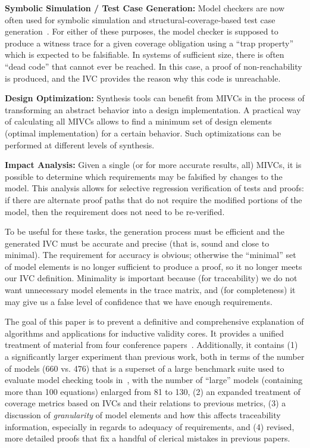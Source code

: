 \noindent \textbf{Symbolic Simulation / Test Case Generation:} Model checkers are now often used for symbolic simulation and structural-coverage-based test case generation~\cite{SimulinkDesignVerifier,Whalen13:OMCDC}.  For either of these purposes, the model checker is supposed to produce a witness trace for a given coverage obligation using a ``trap property'' which is expected to be falsifiable.  In systems of sufficient size, there is often ``dead code'' that cannot ever be reached.  In this case, a proof of non-reachability is produced, and the IVC provides the reason why this code is unreachable.

\noindent \textbf{Design Optimization:} Synthesis tools can benefit from MIVCs in the process of transforming an abstract behavior into a design implementation. A practical way of calculating all MIVCs allows to find a minimum set of design elements (optimal implementation) for a certain behavior. Such optimizations can be performed at different levels of synthesis.

\noindent \textbf{Impact Analysis:} Given a single (or for more accurate results, all) MIVCs, it is possible to determine which requirements may be falsified by changes to the model.  This analysis allows for selective regression verification of tests and proofs: if there are alternate proof paths that do not require the modified portions of the model, then the requirement does not need to be re-verified.

To be useful for these tasks, the generation process must be efficient and the generated IVC must be accurate and precise (that is, sound and close to minimal).  The requirement for accuracy is obvious; otherwise the ``minimal'' set of model elements is no longer sufficient to produce a proof, so it no longer meets our IVC definition.  Minimality is important because (for traceability) we do not want unnecessary model elements in the trace matrix, and (for completeness) it may give us a false level of confidence that we have enough requirements.

The goal of this paper is to prevent a definitive and comprehensive explanation of algorithms and applications for inductive validity cores.  It provides a unified treatment of material from four conference papers~\cite{Ghass16,Murugesan16:renext,Ghass17Cov,Ghass17AllIVCs}.  Additionally, it contains (1) a significantly larger experiment than previous work, both in terms of the number of models (660 vs. 476) that is a superset of a large benchmark suite used to evaluate model checking tools in~\cite{piskac2016}, with the number of ``large'' models (containing more than 100 equations) enlarged from 81 to 130, (2) an expanded treatment of coverage metrics based on IVCs and their relations to previous metrics, (3) a discussion of {\em granularity} of model elements and how this affects traceability information, especially in regards to adequacy of requirements, and (4) revised, more detailed proofs that fix a handful of clerical mistakes in previous papers.


